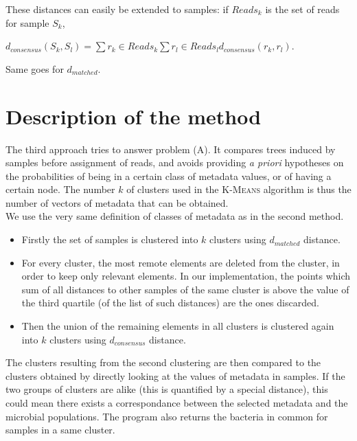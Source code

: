 \documentclass{report}
\begin{document}
\item These distances can easily be extended to samples: if $Reads_{k}$ is the set of reads for sample $S_{k}$,\\
\begin{center}
$d_{consensus}(S_{k},S_{l}) = \sum{r_{k} \in Reads_{k}}{\sum{r_{l} \in Reads_{l}}{d_{consensus}(r_{k},r_{l})}}$.
\end{center} 

Same goes for $d_{matched}$.

\section{Description of the method}

The third approach tries to answer problem (\textsc{A}). It compares trees induced by samples before assignment of reads, and avoids providing \emph{a priori} hypotheses on the probabilities of being in a certain class of metadata values, or of having a certain node. The number $k$ of clusters used in the \textsc{K-Means} algorithm is thus the number of vectors of metadata that can be obtained.\\

We use the very same definition of classes of metadata as in the second method.

\begin{itemize}
\item Firstly the set of samples is clustered into $k$ clusters using $d_{matched}$ distance. 
\item For every cluster, the most remote elements are deleted from the cluster, in order to keep only relevant elements. In our implementation, the points which sum of all distances to other samples of the same cluster is above the value of the third quartile (of the list of such distances) are the ones discarded.
\item Then the union of the remaining elements in all clusters is clustered again into $k$ clusters using $d_{consensus}$ distance.
\end{itemize}

The clusters resulting from the second clustering are then compared to the clusters obtained by directly looking at the values of metadata in samples. If the two groups of clusters are alike (this is quantified by a special distance), this could mean there exists a correspondance between the selected metadata and the microbial populations. The program also returns the bacteria in common for samples in a same cluster.\\
\end{document}
